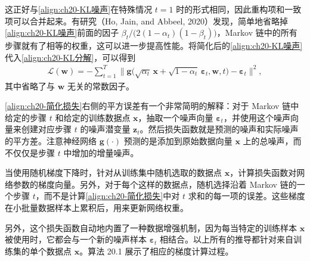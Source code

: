 \documentclass[../../main.tex]{subfiles}
\begin{document}
这正好与\eqref{align:ch20-KL噪声}在特殊情况 $t=1$ 时的形式相同，因此重构项和一致项可以合并起来。有研究（Ho, Jain, and Abbeel, 2020）发现，简单地省略掉\eqref{align:ch20-KL噪声}前面的因子 $\beta_t/\big(2(1-\alpha_t)(1-\beta_t)\big)$，Markov 链中的所有步骤就有了相等的权重，这可以进一步提高性能。将简化后的\eqref{align:ch20-KL噪声}代入\eqref{align:ch20-KL分解}，可以得到
\begin{align}
\mathcal{L}(\bm{w})=-\sum_{t=1}^{T}\big\|\bm{g}\big(\sqrt{\alpha_t}\,\bm{x}+\sqrt{1-\alpha_t}\,\bm{\varepsilon}_t,\bm{w},t\big)-\bm{\varepsilon}_t\big\|^2,
\label{align:ch20-简化损失}
\end{align}
其中省略了与 $\bm{w}$ 无关的常数因子。

\eqref{align:ch20-简化损失}右侧的平方误差有一个非常简明的解释：对于 Markov 链中给定的步骤 $t$ 和给定的训练数据点 $\bm{x}$，抽取一个噪声向量 $\bm{\varepsilon}_t$，并使用这个噪声向量来创建对应步骤 $t$ 的噪声潜变量 $\bm{z}_t$。然后损失函数就是预测的噪声和实际噪声的平方差。注意神经网络 $\bm{g}(\cdot)$ 预测的是添加到原始数据向量 $\bm{x}$ 上的总噪声，而不仅仅是步骤 $t$ 中增加的增量噪声。

当使用随机梯度下降时，针对从训练集中随机选取的数据点 $\bm{x}$，计算损失函数对网络参数的梯度向量。另外，对于每个这样的数据点，随机选择沿着 Markov 链的一个步骤 $t$，而不是计算\eqref{align:ch20-简化损失}中对 $t$ 求和的每一项的误差。这些梯度在小批量数据样本上累积后，用来更新网络权重。

另外，这个损失函数自动地内置了一种数据增强机制，因为每当特定的训练样本 $\bm{x}$ 被使用时，它都会与一个新的噪声样本 $\bm{\varepsilon}_t$ 相结合。以上所有的推导都针对来自训练集的单个数据点 $\bm{x}$。算法 20.1 展示了相应的梯度计算过程。
\end{document}
